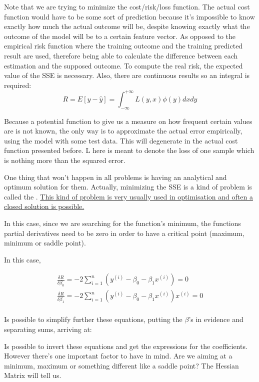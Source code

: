 Note that we are trying to minimize the cost/risk/loss function. The actual cost function would have to be some sort of prediction because it's impossible to know exactly how much the actual outcome will be, despite knowing  exactly what the outcome of the model will be to a certain feature vector. As opposed to the empirical risk function where the training outcome and the training predicted result are used, therefore being able to calculate the difference between each estimation and the supposed outcome. To compute the real risk, the expected value of the SSE is necessary. Also, there are continuous results so an integral is required:
\begin{equation}
    R = E[y-\hat{y}] = \int_{-\infty}^{+\infty} L(y, x) \phi(y) dx dy 
\end{equation}

Because a potential function to give us a measure on how frequent certain values are is not known, the only way is to approximate the actual error empirically, using the model with some test data. This will degenerate in the actual cost function presented before. L here is meant to denote the loss of one sample which is nothing more than the squared error.


One thing that won't happen in all problems is having an analytical and optimum solution for them. Actually, minimizing the SSE is a kind of problem is called the . \ul{This kind of problem is very usually used in optimisation and often a closed solution is possible.}


In this case, since we are searching for the function's minimum, the functions partial derivatives need to be zero in order to have a critical point (maximum, minimum or saddle point).

In this case, 

\begin{align*}
    \frac{\delta R}{\delta \beta_0} = -2 \sum_{i = 1}^n (y^{(i)} - \beta_0 - \beta_1 x^{(i)}) = 0 \\
    \frac{\delta R}{\delta \beta_1} = -2 \sum_{i = 1}^n (y^{(i)} - \beta_0 - \beta_1 x^{(i)})x^{(i)} = 0 \\
\end{align*}

Is possible to simplify further these equations, putting the $\beta$'s in evidence and separating sums, arriving at:


Is possible to invert these equations and get the expressions for the coefficients. However there's one important factor to have in mind. Are we aiming at a minimum, maximum or something different like a saddle point? The Hessian Matrix will tell us.



